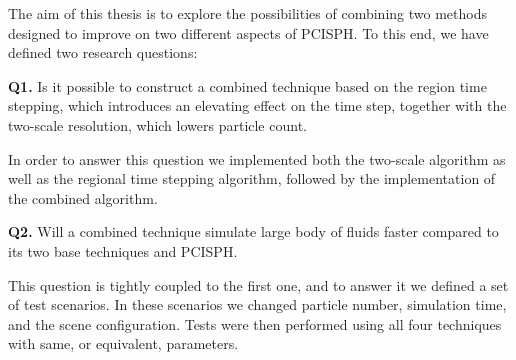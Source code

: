 \documentclass[../../main.tex]{subfiles}
\begin{document}
\tracingall


The aim of this thesis is to explore the possibilities of combining two methods designed to improve on two different aspects of PCISPH. To this end, we have defined two research questions: 

\begin{displayquote}
{\large \textbf{Q1.}} 
Is it possible to construct a combined technique based on the region time stepping, which introduces an elevating effect on the time step, together with the two-scale resolution, which lowers particle count.
\end{displayquote} 

In order to answer this question we implemented both the two-scale algorithm as well as the regional time stepping algorithm, followed by the implementation of the combined algorithm. 

\begin{displayquote}
{\large \textbf{Q2.}} Will a combined technique simulate large body of fluids faster compared to its two base techniques and PCISPH.
\end{displayquote}

This question is tightly coupled to the first one, and to answer it we defined a set of test scenarios. In these scenarios we changed particle number, simulation time, and the scene configuration. Tests were then performed using all four techniques with same, or equivalent, parameters. 
\end{document}
